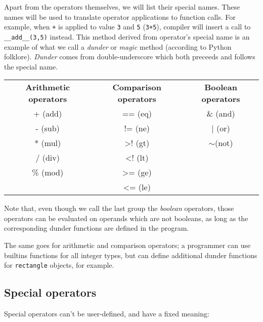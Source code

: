 \documentclass[times, utf8, diplomski]{fer}
\theoremstyle{definition}
\begin{document}
Apart from the operators themselves, we will list their special names. These names
will be used to translate operator applications to function calls. For example, when 
\texttt{+} is applied to value \texttt{3} and \texttt{5} (\texttt{3+5}), compiler
will insert a call to \texttt{\_\_add\_\_(3,5)} instead. This method derived from operator's special name
is an example of what we call a \textit{dunder} or \textit{magic} method (according to Python folklore).
\textit{Dunder} comes from double-underscore which both preceeds and follows the special name.

\begin{table}[H]
\begin{tabular}{ccc}
\textbf{Arithmetic operators} & \textbf{Comparison operators} & \textbf{Boolean operators} \\
+ (add)                       & == (eq)                       & \& (and)                   \\
- (sub)                       & != (ne)                       & | (or)                     \\
* (mul)                       & \textgreater{}! (gt)          & $\sim$(not)                \\
/ (div)                       & \textless{}! (lt)             &                            \\
\% (mod)                      & \textgreater{}= (ge)          &                            \\
                              & \textless{}= (le)             &                           
\end{tabular}
\end{table}

Note that, even though we call the last group the \textit{boolean} operators,
those operators can be evaluated on operands which are not booleans,
as long as the corresponding dunder functions are defined in the program.

The same goes for arithmetic and comparison operators; a programmer can use
builtins functions for all integer types, but can define additional dunder functions
for \texttt{rectangle} objects, for example.

\subsection{Special operators}

Special operators can't be user-defined, and have a fixed meaning:
\end{document}
